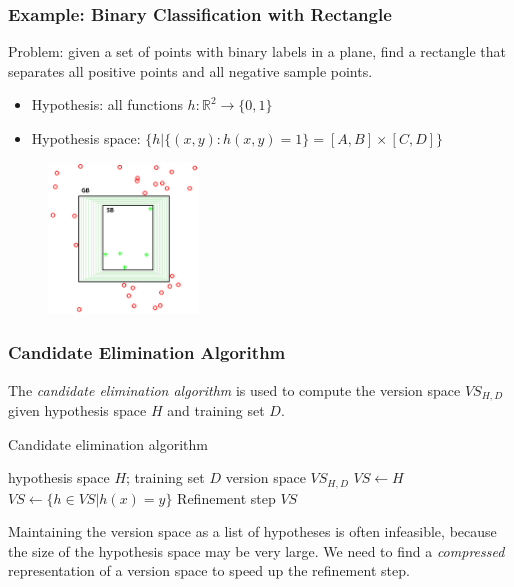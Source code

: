 \documentclass[]{beamer}
\begin{document}
\begin{frame}
\frametitle{Example: Binary Classification with Rectangle }
Problem: given a set of points with binary labels in a plane, find a rectangle that separates all positive points and all negative sample points.
\pause
\begin{itemize}
\item Hypothesis: all functions $h: \mathbb{R}^2 \rightarrow \{0, 1\}$
\item Hypothesis space: $\{h | \{(x, y): h(x, y) = 1\} = [A, B] \times [C, D]\}$
\end{itemize}
\pause
	\begin{figure}[h]
		\centering
		\includegraphics[width=4cm]{rect.png}
	\end{figure}
\end{frame}


\begin{frame}
	\frametitle{Candidate Elimination Algorithm}
	The \textit{candidate elimination algorithm} is used to compute the version space $VS_{H,D}$ given hypothesis space $H$ and training set $D$.
	\begin{algorithm}[H] 
		\caption{Candidate elimination algorithm} 
		\begin{algorithmic}[1] 
			\Require hypothesis space $H$; training set $D$
			\Ensure version space $VS_{H, D}$
			\State $VS \leftarrow H$
			\State $VS \leftarrow \{h \in VS | h(x) = y\}$ \Comment Refinement step
			\EndFor
			\State \Return $VS$
		\end{algorithmic} 
	\end{algorithm}
	\pause
	Maintaining the version space as a list of hypotheses is often infeasible, because the size of the hypothesis space may be very large. We need to find a \textit{compressed} representation of a version space to speed up the refinement step.
\end{frame}
\end{document}
